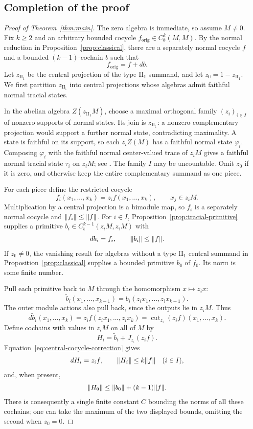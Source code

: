 \subsection{Completion of the proof}

\begin{proof}[Proof of Theorem~\ref{thm:main}]
The zero algebra is immediate, so assume $M\ne0$.
Fix $k\ge2$ and an arbitrary bounded cocycle
$f_{\mathrm{orig}}\in C_b^k(M,M)$.  By the normal reduction in
Proposition~\ref{prop:classical}, there are a separately normal
cocycle $f$ and a bounded $(k-1)$-cochain $b$ such that
\[
 f_{\mathrm{orig}}=f+db.
\]
Let $z_{\mathrm{II}_1}$ be the central projection of the type
$\mathrm{II}_1$ summand, and let $z_0=1-z_{\mathrm{II}_1}$.
We first partition $z_{\mathrm{II}_1}$ into central projections
whose algebras admit faithful normal tracial states.

In the abelian algebra $Z(z_{\mathrm{II}_1}M)$, choose a maximal
orthogonal family $(z_i)_{i\in I}$ of nonzero supports of normal
states.  Its join is $z_{\mathrm{II}_1}$: a nonzero complementary
projection would support a further normal state, contradicting
maximality.  A state is faithful on its support, so each
$z_iZ(M)$ has a faithful normal state $\varphi_i$.  Composing
$\varphi_i$ with the faithful normal center-valued trace of $z_iM$
gives a faithful normal tracial state $\tau_i$ on $z_iM$;
see \cite[Theorem~III.2.5.7 and Corollary~III.2.5.8]{Blackadar2006}.
The family $I$ may be uncountable.  Omit $z_0$ if it is zero,
and otherwise keep the entire complementary summand as one piece.

For each piece define the restricted cocycle
\[
 f_i(x_1,\ldots,x_k)=z_i f(x_1,\ldots,x_k),
 \qquad x_j\in z_iM.
\]
Multiplication by a central projection is a bimodule map, so
$f_i$ is a separately normal cocycle and
$\lVert f_i\rVert\le\lVert f\rVert$.  For $i\in I$,
Proposition~\ref{prop:tracial-primitive} supplies a primitive
$b_i\in C_b^{k-1}(z_iM,z_iM)$ with
\[
 db_i=f_i,\qquad \lVert b_i\rVert\le\lVert f\rVert.
\]
If $z_0\ne0$, the vanishing result for algebras without a type
$\mathrm{II}_1$ central summand in
Proposition~\ref{prop:classical} supplies a bounded primitive
$b_0$ of $f_0$.  Its norm is some finite number.

Pull each primitive back to $M$ through the homomorphism
$x\mapsto z_ix$:
\[
 \widetilde b_i(x_1,\ldots,x_{k-1})
 =b_i(z_ix_1,\ldots,z_ix_{k-1}).
\]
The outer module actions also pull back, since the outputs lie
in $z_iM$.  Thus
\[
 d\widetilde b_i(x_1,\ldots,x_k)
 =z_i f(z_ix_1,\ldots,z_ix_k)
 =\operatorname{cut}_{z_i}(z_if)(x_1,\ldots,x_k).
\]
Define cochains with values in $z_iM$ on all of $M$ by
\[
 H_i=\widetilde b_i+J_{z_i}(z_if).
\]
Equation~\eqref{eq:central-cocycle-correction} gives
\[
 dH_i=z_if,
 \qquad
 \lVert H_i\rVert\le k\lVert f\rVert\quad(i\in I),
\]
and, when present,
\[
 \lVert H_0\rVert\le\lVert b_0\rVert+(k-1)\lVert f\rVert.
\]
There is consequently a single finite constant $C$ bounding the
norms of all these cochains; one can take the maximum of the two
displayed bounds, omitting the second when $z_0=0$.


\end{proof}
